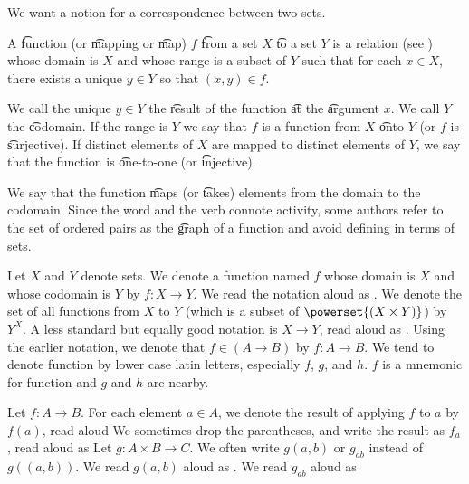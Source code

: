 

We want a notion for a correspondence between two sets.


A \t{function}
(or \t{mapping} or \t{map}) $f$ \t{from} a set $X$ \t{to} a set $Y$ is a relation (see ) whose domain is $X$ and whose range is a subset of $Y$ such that for each $x \in X$, there exists a unique $y \in Y$ so that $(x, y) \in f$.

We call the unique $y \in Y$ the \t{result} of the function \t{at} the \t{argument} $x$.
We call $Y$ the \t{codomain}.
If the range is $Y$ we say that $f$ is a function from $X$ \t{onto} $Y$ (or $f$ is \t{surjective}).
If distinct elements of $X$ are mapped to distinct elements of $Y$, we say that the function is \t{one-to-one} (or \t{injective}).

We say that the function \t{maps} (or \t{takes}) elements from the domain to the codomain.
Since the word  and the verb  connote activity, some authors refer to the set of ordered pairs as the \t{graph} of a function and avoid defining  in terms of sets.


Let $X$ and $Y$ denote sets.
We denote a function named $f$ whose domain is $X$ and whose codomain is $Y$ by $f: X \to Y$.
We read the notation aloud as .
We denote the set of all functions from $X$ to $Y$ (which is a subset of $\powerset{(X \times Y)}$) by $Y^{X}$.
A less standard but equally good notation is $X \to Y$, read aloud as .
Using the earlier notation, we denote that $f \in (A \to B)$ by $f: A \to B$.
We tend to denote function by lower case latin letters, especially $f$, $g$, and $h$.
$f$ is a mnemonic for function and $g$ and $h$ are nearby.

Let $f: A \to B$.
For each element $a \in A$, we denote the result of applying $f$ to $a$ by $f(a)$, read aloud 
We sometimes drop the parentheses, and write the result as $f_a$, read aloud as 
Let $g: A \times B \to C$.
We often write $g(a,b)$ or $g_{ab}$ instead of $g((a,b))$.
We read $g(a, b)$ aloud as .
We read $g_{ab}$ aloud as 

